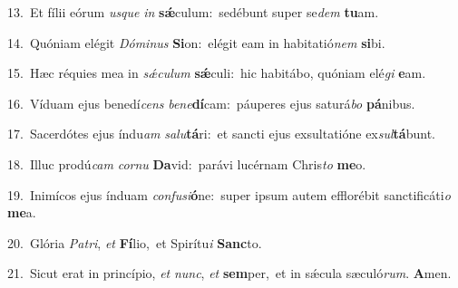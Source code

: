 {\numbfont\textcolor{\numbcolor}{13.}}~Et fílii eórum \textit{us}\-\textit{que} \textit{in} \textbf{sǽ}\-culum:~\star sedébunt super se\textit{dem} \textbf{tu}\-am.\par
{\numbfont\textcolor{\numbcolor}{14.}}~Quóniam elégit \textit{Dó}\-\textit{mi}\textit{nus} \textbf{Si}\-on:~\star elégit eam in habitatió\textit{nem} \textbf{si}\-bi.\par
{\numbfont\textcolor{\numbcolor}{15.}}~Hæc réquies mea in \textit{sǽ}\-\textit{cu}\textit{lum} \textbf{sǽ}\-culi:~\star hic habitábo, quóniam elé\textit{gi} \textbf{e}\-am.\par
{\numbfont\textcolor{\numbcolor}{16.}}~Víduam ejus benedí\textit{cens} \textit{be}\-\textit{ne}\textbf{dí}cam:~\star páuperes ejus saturá\textit{bo} \textbf{pá}\-nibus.\par
{\numbfont\textcolor{\numbcolor}{17.}}~Sacerdótes ejus índu\textit{am} \textit{sa}\-\textit{lu}\textbf{tá}ri:~\star et sancti ejus exsultatióne ex\-\textit{sul}\-\textbf{tá}bunt.\par
{\numbfont\textcolor{\numbcolor}{18.}}~Illuc prodú\textit{cam} \textit{cor}\-\textit{nu} \textbf{Da}\-vid:~\star parávi lucérnam Chris\textit{to} \textbf{me}\-o.\par
{\numbfont\textcolor{\numbcolor}{19.}}~Inimícos ejus índuam \textit{con}\-\textit{fu}\textit{si}\textbf{ó}ne:~\star super ipsum autem efflorébit sanctificáti\textit{o} \textbf{me}\-a.\par
{\numbfont\textcolor{\numbcolor}{20.}}~Glória \textit{Pa}\-\textit{tri}, \textit{et} \textbf{Fí}\-lio,~\star et Spirítu\textit{i} \textbf{Sanc}\-to.\par
{\numbfont\textcolor{\numbcolor}{21.}}~Sicut erat in princípio, \textit{et} \textit{nunc}\-, \textit{et} \textbf{sem}\-per,~\star et in sǽcula sæculó\-\textit{rum}\-. \textbf{A}\-men.\par
